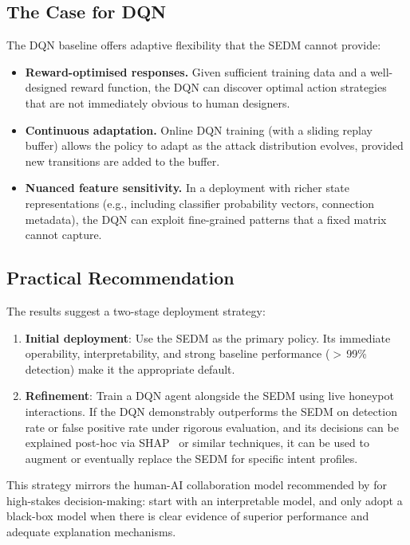 \subsection{The Case for DQN}

The DQN baseline offers adaptive flexibility that the SEDM cannot provide:
%
\begin{itemize}
  \item \textbf{Reward-optimised responses.}
        Given sufficient training data and a well-designed reward function,
        the DQN can discover optimal action strategies that are not
        immediately obvious to human designers.
  \item \textbf{Continuous adaptation.}
        Online DQN training (with a sliding replay buffer) allows the policy
        to adapt as the attack distribution evolves, provided new transitions
        are added to the buffer.
  \item \textbf{Nuanced feature sensitivity.}
        In a deployment with richer state representations (e.g., including
        classifier probability vectors, connection metadata), the DQN can
        exploit fine-grained patterns that a fixed matrix cannot capture.
\end{itemize}

\subsection{Practical Recommendation}

The results suggest a two-stage deployment strategy:
%
\begin{enumerate}
  \item \textbf{Initial deployment}: Use the SEDM as the primary policy.
        Its immediate operability, interpretability, and strong baseline
        performance ($>$\,99\% detection) make it the appropriate default.
  \item \textbf{Refinement}: Train a DQN agent alongside the SEDM using
        live honeypot interactions.
        If the DQN demonstrably outperforms the SEDM on detection rate or
        false positive rate under rigorous evaluation, and its decisions
        can be explained post-hoc via SHAP~\citep{lundberg2017unified} or
        similar techniques, it can be used to augment or eventually replace
        the SEDM for specific intent profiles.
\end{enumerate}

This strategy mirrors the human-AI collaboration model recommended by
\citet{rudin2019stop} for high-stakes decision-making: start with an
interpretable model, and only adopt a black-box model when there is
clear evidence of superior performance and adequate explanation mechanisms.

